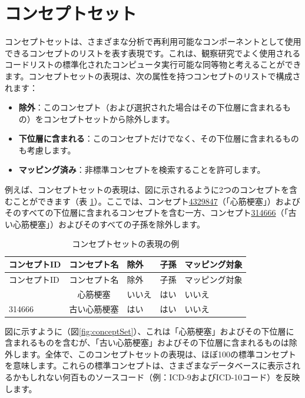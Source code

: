 \documentclass[
  11pt]{book}
\providecommand{\tightlist}{%
  \setlength{\itemsep}{0pt}\setlength{\parskip}{0pt}}
\theoremstyle{definition}
\theoremstyle{definition}
\theoremstyle{definition}
\theoremstyle{definition}
\theoremstyle{remark}
\begin{document}
\section{コンセプトセット}\label{conceptSets}


コンセプトセットは、さまざまな分析で再利用可能なコンポーネントとして使用できるコンセプトのリストを表す表現です。これは、観察研究でよく使用されるコードリストの標準化されたコンピュータ実行可能な同等物と考えることができます。コンセプトセットの表現は、次の属性を持つコンセプトのリストで構成されます：

\begin{itemize}
\tightlist
\item
  \textbf{除外}：このコンセプト（および選択された場合はその下位層に含まれるもの）をコンセプトセットから除外します。
\item
  \textbf{下位層に含まれる}：このコンセプトだけでなく、その下位層に含まれるものも考慮します。
\item
  \textbf{マッピング済み}：非標準コンセプトを検索することを許可します。
\end{itemize}

例えば、コンセプトセットの表現は、図に示されるように2つのコンセプトを含むことができます（表 \ref{tab:conceptSetExpression}）。ここでは、コンセプト\href{http://athena.ohdsi.org/search-terms/terms/4329847}{4329847}（「心筋梗塞」）およびそのすべての下位層に含まれるコンセプトを含む一方、コンセプト\href{http://athena.ohdsi.org/search-terms/terms/314666}{314666}（「古い心筋梗塞」）およびそのすべての子孫を除外します。

\begin{longtable}[]{@{}lclll@{}}
\caption{\label{tab:conceptSetExpression} コンセプトセットの表現の例}\tabularnewline
\toprule\noalign{}
コンセプトID & コンセプト名 & 除外 & 子孫 & マッピング対象 \\
\midrule\noalign{}
\endfirsthead
\toprule\noalign{}
コンセプトID & コンセプト名 & 除外 & 子孫 & マッピング対象 \\
\midrule\noalign{}
\endhead
\bottomrule\noalign{}
\endlastfoot
4329847 & 心筋梗塞 & いいえ & はい & いいえ \\
314666 & 古い心筋梗塞 & はい & はい & いいえ \\
\end{longtable}

図に示すように（図\ref{fig:conceptSet}）、これは「心筋梗塞」およびその下位層に含まれるものを含むが、「古い心筋梗塞」およびその下位層に含まれるものは除外します。全体で、このコンセプトセットの表現は、ほぼ100の標準コンセプトを意味します。これらの標準コンセプトは、さまざまなデータベースに表示されるかもしれない何百ものソースコード（例：ICD-9およびICD-10コード）を反映します。
\end{document}
